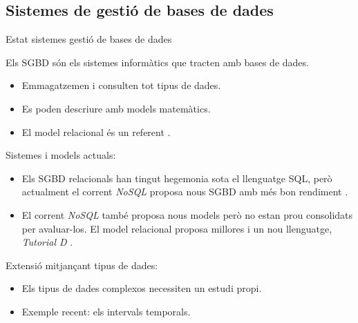 \subsection[SGBD]{Sistemes de gestió de bases de dades}
\begin{frame}{Estat sistemes gestió de bases de dades}

  Els SGBD són els sistemes informàtics que tracten amb bases de
  dades. 

  \begin{itemize}  

  \item Emmagatzemen i consulten tot tipus de dades.

  \item Es poden descriure amb models matemàtics.

  \item El model relacional és un
    referent \parencite{date:introduction}.

  \end{itemize}
  
Sistemes i models actuals:

  \begin{itemize}  

  \item Els SGBD relacionals han tingut hegemonia sota el llenguatge
    SQL, però actualment el corrent \emph{NoSQL} proposa nous SGBD amb
    més bon rendiment \parencite{stonebraker10}.


  \item El corrent \emph{NoSQL} també proposa nous models però no
    estan prou consolidats per avaluar-los. El model relacional
    proposa millores i un nou llenguatge, \emph{Tutorial
      D} \parencite{date06,date:thethirdmanifesto}.

  \end{itemize}

  Extensió mitjançant tipus de dades:

  \begin{itemize}

  \item Els tipus de dades complexos necessiten un estudi propi.

  \item Exemple recent: els intervals temporals.

  \end{itemize}
  
\end{frame}


